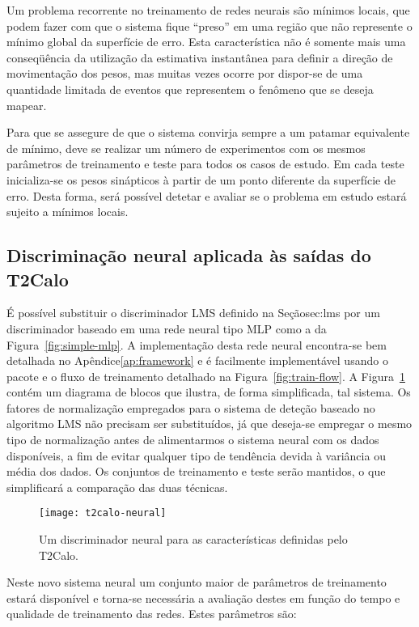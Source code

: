 Um problema recorrente no treinamento de redes neurais são mínimos locais, que
podem fazer com que o sistema fique ``preso'' em uma região que não represente
o mínimo global da superfície de erro. Esta característica não é somente mais
uma conseqüência da utilização da estimativa instantânea para definir a
direção de movimentação dos pesos, mas muitas vezes ocorre por dispor-se de
uma quantidade limitada de eventos que representem o fenômeno que se deseja
mapear.

Para que se assegure de que o sistema convirja sempre a um patamar equivalente
de mínimo, deve se realizar um número de experimentos com os mesmos parâmetros
de treinamento e teste para todos os casos de estudo. Em cada teste
inicializa-se os pesos sinápticos à partir de um ponto diferente da superfície
de erro. Desta forma, será possível detetar e avaliar se o problema em estudo
estará sujeito a mínimos locais.

\subsection{Discriminação neural aplicada às saídas do T2Calo}

É possível substituir o discriminador LMS definido na Seção{sec:lms} por um
discriminador baseado em uma rede neural tipo MLP como a da
Figura~\ref{fig:simple-mlp}. A implementação desta rede neural encontra-se bem
detalhada no Apêndice\ref{ap:framework} e é facilmente implementável usando
o pacote  e o fluxo de treinamento detalhado na
Figura~\ref{fig:train-flow}. A Figura~\ref{fig:t2calo-neural} contém um
diagrama de blocos que ilustra, de forma simplificada, tal sistema. Os fatores
de normalização empregados para o sistema de deteção baseado no algoritmo LMS
não precisam ser substituídos, já que deseja-se empregar o mesmo tipo de
normalização antes de alimentarmos o sistema neural com os dados disponíveis,
a fim de evitar qualquer tipo de tendência devida à variância ou média dos
dados. Os conjuntos de treinamento e teste serão mantidos, o que simplificará
a comparação das duas técnicas.

\begin{figure}
\begin{center}
\texttt{[image: t2calo-neural]}
\end{center}
\caption{Um discriminador neural para as características definidas pelo
T2Calo.}
\label{fig:t2calo-neural}
\end{figure}

Neste novo sistema neural um conjunto maior de parâmetros de treinamento
estará disponível e torna-se necessária a avaliação destes em função do tempo
e qualidade de treinamento das redes. Estes parâmetros são:

